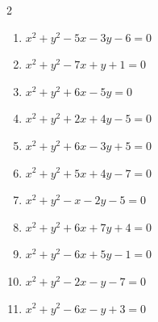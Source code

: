 \begin{multicols}{2}
\begin{enumerate}
  \item $x^{2}+y^{2}-5x-3y-6=0$


  \item $x^{2}+y^{2}-7x+y+1=0$


  \item $x^{2}+y^{2}+6x-5y=0$


  \item $x^{2}+y^{2}+2x+4y-5=0$


  \item $x^{2}+y^{2}+6x-3y+5=0$


  \item $x^{2}+y^{2}+5x+4y-7=0$


  \item $x^{2}+y^{2}-x-2y-5=0$


  \item $x^{2}+y^{2}+6x+7y+4=0$


  \item $x^{2}+y^{2}-6x+5y-1=0$


  \item $x^{2}+y^{2}-2x-y-7=0$


  \item $x^{2}+y^{2}-6x-y+3=0$


\end{enumerate}
\end{multicols}
